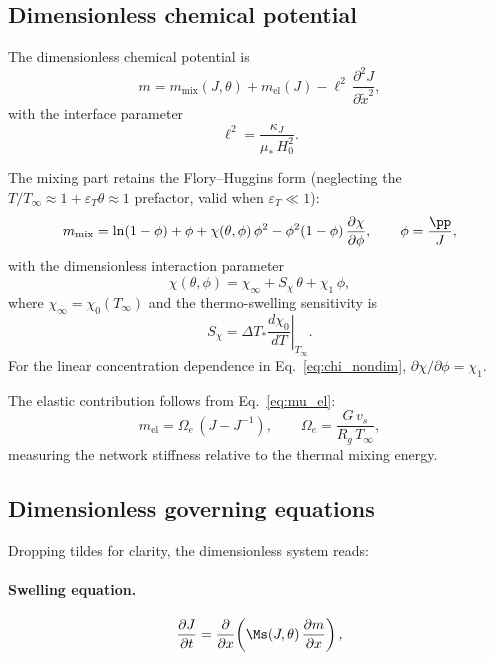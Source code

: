 \subsection{Dimensionless chemical potential}

The dimensionless chemical potential is
\begin{equation}
  m = m_\mathrm{mix}(J,\theta) + m_\mathrm{el}(J) - \ell^2\,\frac{\partial^2 J}{\partial \tilde{x}^2},
  \label{eq:m_nondim}
\end{equation}
with the interface parameter
\begin{equation}
  \ell^2 = \frac{\kappa_J}{\mu_*\,H_0^2}.
\end{equation}

The mixing part retains the Flory--Huggins form (neglecting the
$T/T_\infty\approx 1+\varepsilon_T\theta\approx 1$ prefactor, valid
when $\varepsilon_T\ll 1$):
\begin{equation}
  m_\mathrm{mix} = \ln(1-\phi) + \phi + \chi(\theta,\phi)\,\phi^2
  -\phi^2(1-\phi)\,\frac{\partial\chi}{\partial\phi},
  \qquad \phi = \frac{\pp}{J},
  \label{eq:m_mix}
\end{equation}
with the dimensionless interaction parameter
\begin{equation}
  \chi(\theta,\phi) = \chi_\infty + S_\chi\,\theta + \chi_1\,\phi,
  \label{eq:chi_nondim}
\end{equation}
where $\chi_\infty = \chi_0(T_\infty)$ and the thermo-swelling sensitivity is
\begin{equation}
  S_\chi = \Delta T_*\left.\frac{d\chi_0}{dT}\right|_{T_\infty}.
  \label{eq:Schi}
\end{equation}
For the linear concentration dependence in Eq.~\eqref{eq:chi_nondim},
$\partial\chi/\partial\phi=\chi_1$.

The elastic contribution follows from Eq.~\eqref{eq:mu_el}:
\begin{equation}
  m_\mathrm{el} = \Omega_e\,(J - J^{-1}),
  \qquad
  \Omega_e = \frac{G\,v_s}{R_g\,T_\infty},
\end{equation}
measuring the network stiffness relative to the thermal mixing energy.

\subsection{Dimensionless governing equations}

Dropping tildes for clarity, the dimensionless system reads:

\paragraph{Swelling equation.}
\begin{equation}
  \frac{\partial J}{\partial t}
  = \frac{\partial}{\partial x}\!\left(\Ms(J,\theta)\,\frac{\partial m}{\partial x}\right),
  \label{eq:J_nondim}
\end{equation}

